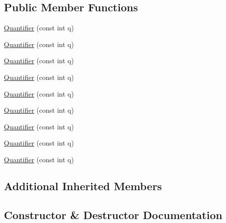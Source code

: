 \subsection*{Public Member Functions}
\begin{DoxyCompactItemize}
\item 
\mbox{\hyperlink{structfakeit_1_1Quantifier_3_01void_01_4_aa43b73adf29aa234b3c15b66c9e985c0}{Quantifier}} (const int q)
\item 
\mbox{\hyperlink{structfakeit_1_1Quantifier_3_01void_01_4_aa43b73adf29aa234b3c15b66c9e985c0}{Quantifier}} (const int q)
\item 
\mbox{\hyperlink{structfakeit_1_1Quantifier_3_01void_01_4_aa43b73adf29aa234b3c15b66c9e985c0}{Quantifier}} (const int q)
\item 
\mbox{\hyperlink{structfakeit_1_1Quantifier_3_01void_01_4_aa43b73adf29aa234b3c15b66c9e985c0}{Quantifier}} (const int q)
\item 
\mbox{\hyperlink{structfakeit_1_1Quantifier_3_01void_01_4_aa43b73adf29aa234b3c15b66c9e985c0}{Quantifier}} (const int q)
\item 
\mbox{\hyperlink{structfakeit_1_1Quantifier_3_01void_01_4_aa43b73adf29aa234b3c15b66c9e985c0}{Quantifier}} (const int q)
\item 
\mbox{\hyperlink{structfakeit_1_1Quantifier_3_01void_01_4_aa43b73adf29aa234b3c15b66c9e985c0}{Quantifier}} (const int q)
\item 
\mbox{\hyperlink{structfakeit_1_1Quantifier_3_01void_01_4_aa43b73adf29aa234b3c15b66c9e985c0}{Quantifier}} (const int q)
\item 
\mbox{\hyperlink{structfakeit_1_1Quantifier_3_01void_01_4_aa43b73adf29aa234b3c15b66c9e985c0}{Quantifier}} (const int q)
\end{DoxyCompactItemize}
\subsection*{Additional Inherited Members}


\subsection{Constructor \& Destructor Documentation}
\mbox{\label{structfakeit_1_1Quantifier_3_01void_01_4_aa43b73adf29aa234b3c15b66c9e985c0}} 
